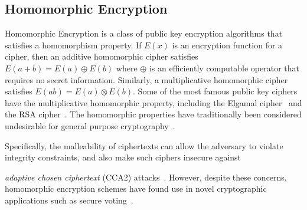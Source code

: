 \subsection{Homomorphic Encryption}

Homomorphic Encryption is a class of public key encryption algorithms
that satisfies a homomorphism property. If $E(x)$ is an encryption
function for a cipher, then an additive homomorphic cipher satisfies
$E(a+b)=E(a)\oplus E(b)$ where $\oplus$ is an efficiently computable
operator that requires no secret information. Similarly, a multiplicative
homomorphic cipher satisfies $E(ab)=E(a)\otimes E(b)$. Some of the
most famous public key ciphers have the multiplicative homomorphic
property, including the Elgamal cipher~\cite{elgamal85} and the RSA
cipher~\cite{rivest83rsa}. The homomorphic properties have traditionally
been considered undesirable for general purpose cryptography~\cite{jmsw02}.
%
\begin{comment}
mention Cramer-Shoup? 
\end{comment}
{}Specifically, the malleability of ciphertexts can allow the adversary
to violate integrity constraints, and also make such ciphers insecure
against %
\begin{comment}
because the homomorphic structure aids in cryptanalysis and allows
encrypted messages to be modified, violating integrity 
constraints~\cite{jmsw02}. This leads to insecurity against 
\end{comment}
{}\emph{adaptive chosen ciphertext} (CCA2) attacks~\cite{bleichenbacher98chosen}.
However, despite these concerns, homomorphic encryption schemes have
found use in novel cryptographic applications such as secure
voting~\cite{benaloh94}. 

